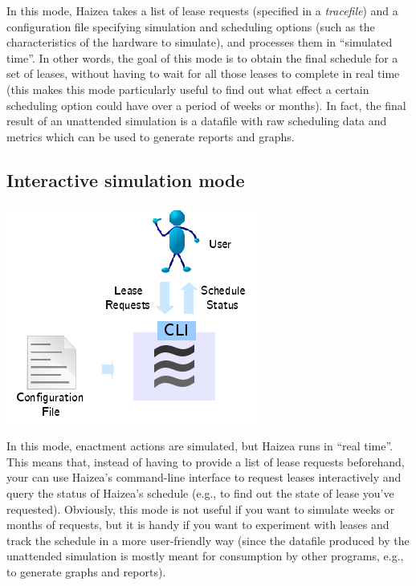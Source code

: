 In this mode, Haizea takes a list of lease requests (specified in a \emph{tracefile}) and a configuration file specifying simulation and scheduling options (such as the characteristics of the hardware to simulate), and processes them in ``simulated time''. In other words, the goal of this mode is to obtain the final schedule for a set of leases, without having to wait for all those leases to complete in real time (this makes this mode particularly useful to find out what effect a certain scheduling option could have over a period of weeks or months). In fact, the final result of an unattended simulation is a datafile with raw scheduling data and metrics which can be used to generate reports and graphs.

\subsection{Interactive simulation mode}

\begin{center}
\includegraphics{images/mode_interactive_simulation.png}
\end{center}

In this mode, enactment actions are simulated, but Haizea runs in ``real time''. This means that, instead of having to provide a list of lease requests beforehand, your can use Haizea's command-line interface to request leases interactively and query the status of Haizea's schedule (e.g., to find out the state of lease you've requested). Obviously, this mode is not useful if you want to simulate weeks or months of requests, but it is handy if you want to experiment with leases and track the schedule in a more user-friendly way (since the datafile produced by the unattended simulation is mostly meant for consumption by other programs, e.g., to generate graphs and reports).


